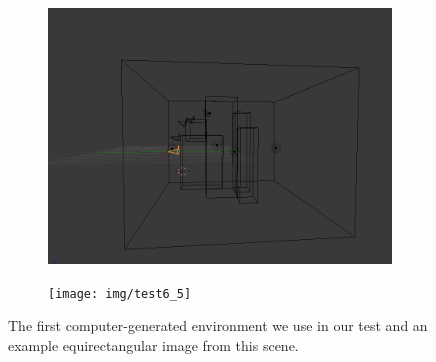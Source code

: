 \begin{figure}
\begin{subfigure}{0.4\textwidth}
		\includegraphics[width=\textwidth]{img/test6_4}
	\end{subfigure}
	\begin{subfigure}{0.8\textwidth}
		\centering
		\texttt{[image: img/test6\_5]}
	\end{subfigure}
	\caption{The first computer-generated environment we use in our test and
	an example equirectangular image from this scene.}
    \label{fig:test6}
\end{figure}
%


